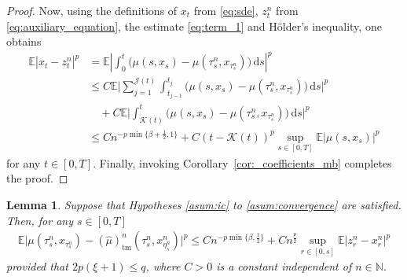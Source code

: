\documentclass[reqno,  oneside, 12pt]{amsart}
\newtheorem{lemma}{Lemma}[section]
\newcommand{\E}{\mathbb E}
\begin{document}
\begin{proof}
	
	Now, using the definitions of \( x_t \) from \eqref{eq:sde}, \( z_t^n \) from \eqref{eq:auxiliary_equation}, the estimate \eqref{eq:term_1} and H\"older's inequality, one obtains
	\begin{align*} %
		\mathbb{E}|x_t - z_t^n|^p 
		&= \mathbb{E}\left| \int_0^t \big( \mu(s, x_s) - \mu(\tau^n_s, x_{\tau^n_s}) \big) \,\mathrm{d}s \right|^p \\
		&\leq C \mathbb{E}\bigg| \sum_{j=1}^{\mathcal{J}(t)} \int_{t_{j-1}}^{t_j} \big( \mu(s, x_s) - \mu(\tau^n_s, x_{\tau^n_s}) \big) \,\mathrm{d}s \bigg|^p \\
		&\quad + C \mathbb{E}\bigg| \int_{\mathcal{K}(t)}^{t} \big( \mu(s, x_s) - \mu(\tau^n_s, x_{\tau^n_s}) \big) \,\mathrm{d}s \bigg|^p \\
		&\leq C n^{-p \min\{\beta + \frac{1}{2}, 1\}} + C (t - \mathcal{K}(t))^p \sup_{s \in [0,T]} \mathbb{E}\big|\mu(s, x_s)\big|^p
	\end{align*}
	for any \( t \in [0,T] \). Finally, invoking Corollary~\ref{cor:_coefficients_mb} completes the proof.
\end{proof}

\begin{lemma} \label{lem:conv_tame_drift}
	Suppose that Hypotheses \mbox{\normalfont  \ref{asum:ic}} to  \textnormal{\ref{asum:convergence}} are satisfied. Then, for any $s \in [0, T]$
	\begin{align*}
		\E\big|\mu(\tau_s^n,x_{\tau^n_s})-(\widehat {\mu})_{\mathrm{tm}}^{\displaystyle n}(\tau_s^n,x_{\eta^n_s}^{n})\big|^p\leq Cn^{-p\min\{\beta,\frac{1}{2}\}}+ Cn^{\frac{p}{2}}\sup_{ r\in[0,s]}\E|z_r^n-x_r^n|^p
	\end{align*}
	provided that $2p(\xi+1)\leq q$,	where $C>0$    is a constant independent of  $n\in \mathbb N$. 
\end{lemma}
\end{document}
